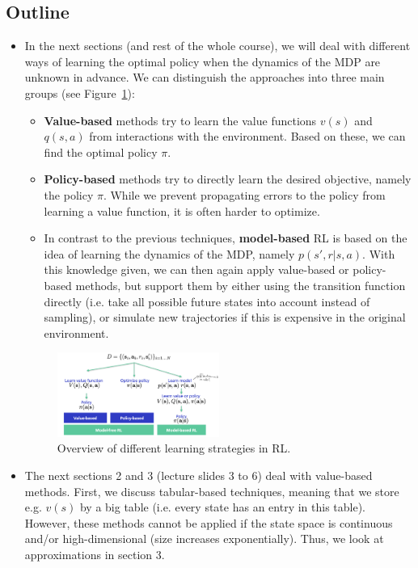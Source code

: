\subsection{Outline}
\begin{itemize}
	\item In the next sections (and rest of the whole course), we will deal with different ways of learning the optimal policy when the dynamics of the MDP are unknown in advance. We can distinguish the approaches into three main groups (see Figure~\ref{fig:rl_introduction_overview_leanring_techniques}):
	\begin{itemize}
		\item \textbf{Value-based} methods try to learn the value functions $v(s)$ and $q(s,a)$ from interactions with the environment. Based on these, we can find the optimal policy $\pi$.
		\item \textbf{Policy-based} methods try to directly learn the desired objective, namely the policy $\pi$. While we prevent propagating errors to the policy from learning a value function, it is often harder to optimize.
		\item In contrast to the previous techniques, \textbf{model-based} RL is based on the idea of learning the dynamics of the MDP, namely $p(s',r|s,a)$. With this knowledge given, we can then again apply value-based or policy-based methods, but support them by either using the transition function directly (i.e. take all possible future states into account instead of sampling), or simulate new trajectories if this is expensive in the original environment. 
	\end{itemize}
	\begin{figure}[ht!]
		\centering
		\includegraphics[width=0.5\textwidth]{figures/rl_introduction_overview_leanring_techniques.png}
		\caption{Overview of different learning strategies in RL.}
		\label{fig:rl_introduction_overview_leanring_techniques}
	\end{figure}
	\item The next sections 2 and 3 (lecture slides 3 to 6) deal with value-based methods. First, we discuss tabular-based techniques, meaning that we store e.g. $v(s)$ by a big table (i.e. every state has an entry in this table). However, these methods cannot be applied if the state space is continuous and/or high-dimensional (size increases exponentially). Thus, we look at approximations in section 3.

\end{itemize}
